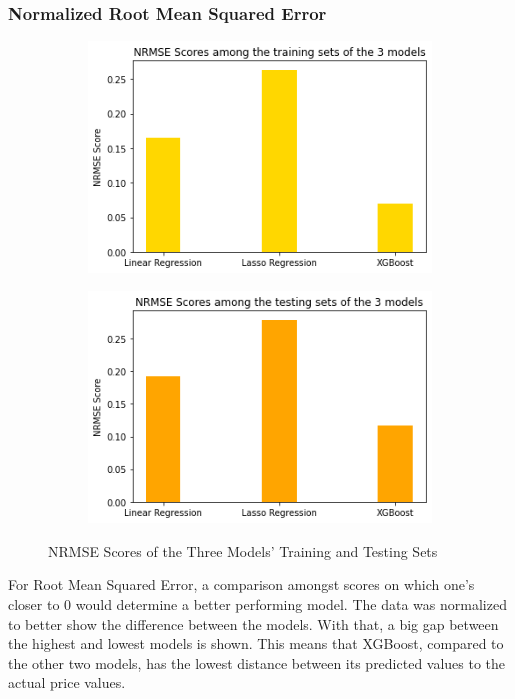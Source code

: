 \documentclass[runningheads]{llncs}
\begin{document}
\subsubsection{Normalized Root Mean Squared Error}
\;
\begin{figure}
	\begin{subfigure}{.5\textwidth}
		\centering
		\includegraphics[width=.8\linewidth]{FIGURES/train_NRMSE.png}
		
	\end{subfigure}%
	\begin{subfigure}{.5\textwidth}
		\centering
		\includegraphics[width=.8\linewidth]{FIGURES/test_NRMSE.png}
		
	\end{subfigure}
	\caption{NRMSE Scores of the Three Models’ Training and Testing Sets }
\end{figure}

For Root Mean Squared Error, a comparison amongst scores on which one’s closer to 0 would determine a better performing model. The data was normalized to better show the difference between the models. With that, a big gap between the highest and lowest models is shown. This means that XGBoost, compared to the other two models, has the lowest distance between its predicted values to the actual price values.
\end{document}
